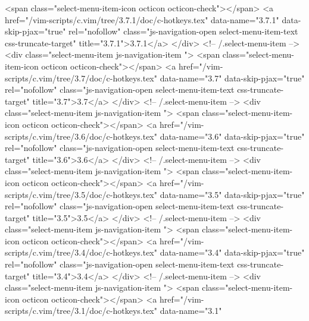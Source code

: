               <span class="select-menu-item-icon octicon octicon-check"></span>
              <a href="/vim-scripts/c.vim/tree/3.7.1/doc/c-hotkeys.tex"
                 data-name="3.7.1"
                 data-skip-pjax="true"
                 rel="nofollow"
                 class="js-navigation-open select-menu-item-text css-truncate-target"
                 title="3.7.1">3.7.1</a>
            </div> <!-- /.select-menu-item -->
            <div class="select-menu-item js-navigation-item ">
              <span class="select-menu-item-icon octicon octicon-check"></span>
              <a href="/vim-scripts/c.vim/tree/3.7/doc/c-hotkeys.tex"
                 data-name="3.7"
                 data-skip-pjax="true"
                 rel="nofollow"
                 class="js-navigation-open select-menu-item-text css-truncate-target"
                 title="3.7">3.7</a>
            </div> <!-- /.select-menu-item -->
            <div class="select-menu-item js-navigation-item ">
              <span class="select-menu-item-icon octicon octicon-check"></span>
              <a href="/vim-scripts/c.vim/tree/3.6/doc/c-hotkeys.tex"
                 data-name="3.6"
                 data-skip-pjax="true"
                 rel="nofollow"
                 class="js-navigation-open select-menu-item-text css-truncate-target"
                 title="3.6">3.6</a>
            </div> <!-- /.select-menu-item -->
            <div class="select-menu-item js-navigation-item ">
              <span class="select-menu-item-icon octicon octicon-check"></span>
              <a href="/vim-scripts/c.vim/tree/3.5/doc/c-hotkeys.tex"
                 data-name="3.5"
                 data-skip-pjax="true"
                 rel="nofollow"
                 class="js-navigation-open select-menu-item-text css-truncate-target"
                 title="3.5">3.5</a>
            </div> <!-- /.select-menu-item -->
            <div class="select-menu-item js-navigation-item ">
              <span class="select-menu-item-icon octicon octicon-check"></span>
              <a href="/vim-scripts/c.vim/tree/3.4/doc/c-hotkeys.tex"
                 data-name="3.4"
                 data-skip-pjax="true"
                 rel="nofollow"
                 class="js-navigation-open select-menu-item-text css-truncate-target"
                 title="3.4">3.4</a>
            </div> <!-- /.select-menu-item -->
            <div class="select-menu-item js-navigation-item ">
              <span class="select-menu-item-icon octicon octicon-check"></span>
              <a href="/vim-scripts/c.vim/tree/3.1/doc/c-hotkeys.tex"
                 data-name="3.1"

